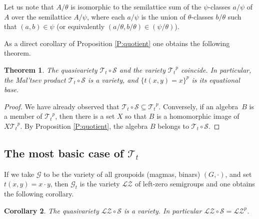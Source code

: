 \documentclass{birkau}
\newcommand{\mc}{\mathcal}
\newcommand{\mcT}{\mathcal{T}}
\newcommand{\mcS}{\mathcal{S}}
\newcommand{\pro}[1]{{#1}^p}
\theoremstyle{plain}
\newtheorem{theorem}{Theorem}[section]
\newtheorem{corollary}[theorem]{Corollary}
\theoremstyle{definition}
\numberwithin{equation}{section}
\begin{document}
Let us note that $A/\theta$ is isomorphic to the semilattice sum of the $\psi$-classes
$a/\psi$ of $A$ over the semilattice $A/\psi$, where each $a/\psi$ is the union of
$\theta$-classes $b/\theta$ such that $(a,b) \in \psi$ (or equivalently $(a/\theta,
b/\theta) \in (\psi/\theta)$).

As a direct corollary of Proposition \ref{P:quotient} one obtains the following theorem.

\begin{theorem}\label{T:varPt}
The quasivariety $\mcT_{t} \circ \mcS$ and the variety $\pro{\mcT_t}$ coincide.
In particular, the Mal'tsev product $\mcT_{t} \circ \mcS$ is a variety, and $\{t(x,y) = x\}^p$ is its equational base.
\end{theorem}

\begin{proof}
  We have already observed that $\mcT_t \circ \mcS \subseteq \pro{\mcT_t}$. Conversely, if
  an algebra~$B$ is a member of $\pro{\mcT_t}$, then there is a set $X$ so that $B$ is a
  homomorphic image of $X\pro{\mcT_t}$. By Proposition \ref{P:quotient}, the algebra
  $B$ belongs to $\mcT_t \circ \mcS$.
\end{proof}

\subsection{The most basic case of $\mcT_t$}\label{S:LZS}
If we take $\mathcal G$ to be the variety of all groupoids  (magmas, binars) $(G, \cdot)$, and set
$t(x,y) = x \cdot y$, then $\mathcal G_t$ is the variety $\mc{LZ}$ of left-zero semigroups and
one obtains the following corollary.

\begin{corollary}\label{C:LZS}
The quasivariety $\mc{LZ} \circ \mc{S}$ is a variety. In particular $\mc{LZ} \circ \mc{S} = \pro{\mc{LZ}}$.
\end{corollary}
\end{document}
